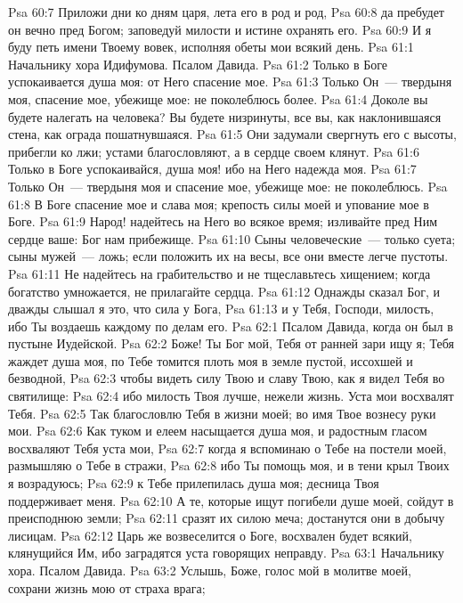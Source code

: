 \vs Psa 60:7 Приложи дни ко дням царя, лета его  в род и род,
\vs Psa 60:8 да пребудет он вечно пред Богом; заповедуй милости и истине охранять его.
\vs Psa 60:9 И я буду петь имени Твоему вовек, исполняя обеты мои всякий день.
\vs Psa 61:1 Начальнику хора Идифумова. Псалом Давида.
\rsbpar\vs Psa 61:2 Только в Боге успокаивается душа моя: от Него спасение мое.
\vs Psa 61:3 Только Он~--- твердыня моя, спасение мое, убежище мое: не поколеблюсь более.
\vs Psa 61:4 Доколе вы будете налегать на человека? Вы будете низринуты, все вы, как наклонившаяся стена, как ограда пошатнувшаяся.
\vs Psa 61:5 Они задумали свергнуть его с высоты, прибегли ко лжи; устами благословляют, а в сердце своем клянут.
\vs Psa 61:6 Только в Боге успокаивайся, душа моя! ибо на Него надежда моя.
\vs Psa 61:7 Только Он~--- твердыня моя и спасение мое, убежище мое: не поколеблюсь.
\vs Psa 61:8 В Боге спасение мое и слава моя; крепость силы моей и упование мое в Боге.
\vs Psa 61:9 Народ! надейтесь на Него во всякое время; изливайте пред Ним сердце ваше: Бог нам прибежище.
\vs Psa 61:10 Сыны человеческие~--- только суета; сыны мужей~--- ложь; если положить их на весы, все они вместе легче пустоты.
\vs Psa 61:11 Не надейтесь на грабительство и не тщеславьтесь хищением; когда богатство умножается, не прилагайте  сердца.
\vs Psa 61:12 Однажды сказал Бог, и дважды слышал я это, что сила у Бога,
\vs Psa 61:13 и у Тебя, Господи, милость, ибо Ты воздаешь каждому по делам его.
\vs Psa 62:1 Псалом Давида, когда он был в пустыне Иудейской.
\rsbpar\vs Psa 62:2 Боже! Ты Бог мой, Тебя от ранней зари ищу я; Тебя жаждет душа моя, по Тебе томится плоть моя в земле пустой, иссохшей и безводной,
\vs Psa 62:3 чтобы видеть силу Твою и славу Твою, как я видел Тебя во святилище:
\vs Psa 62:4 ибо милость Твоя лучше, нежели жизнь. Уста мои восхвалят Тебя.
\vs Psa 62:5 Так благословлю Тебя в жизни моей; во имя Твое вознесу руки мои.
\vs Psa 62:6 Как туком и елеем насыщается душа моя, и радостным гласом восхваляют Тебя уста мои,
\vs Psa 62:7 когда я вспоминаю о Тебе на постели моей, размышляю о Тебе в  стражи,
\vs Psa 62:8 ибо Ты помощь моя, и в тени крыл Твоих я возрадуюсь;
\vs Psa 62:9 к Тебе прилепилась душа моя; десница Твоя поддерживает меня.
\vs Psa 62:10 А те, которые ищут погибели душе моей, сойдут в преисподнюю земли;
\vs Psa 62:11 сразят их силою меча; достанутся они в добычу лисицам.
\vs Psa 62:12 Царь же возвеселится о Боге, восхвален будет всякий, клянущийся Им, ибо заградятся уста говорящих неправду.
\vs Psa 63:1 Начальнику хора. Псалом Давида.
\rsbpar\vs Psa 63:2 Услышь, Боже, голос мой в молитве моей, сохрани жизнь мою от страха врага;
